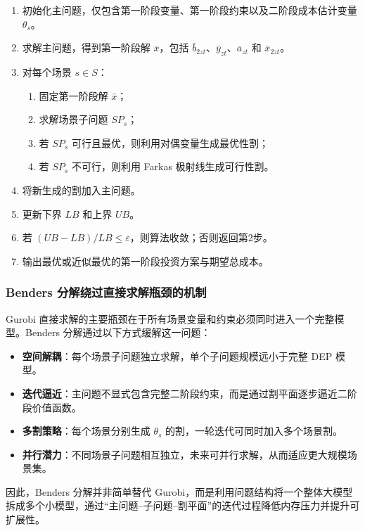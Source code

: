 \documentclass[12pt,a4paper]{article}
\newcommand{\手批注}[2]{\textcolor{#1}{\text{\kaishu #2}}}
\newcommand{\一阶段}{\textcolor{firststage}{\text{\kaishu （一阶段）}}}
\newcommand{\二阶段}{\textcolor{secondstage}{\text{\kaishu （二阶段）}}}
\begin{document}
\begin{enumerate}[itemsep=0.2em,leftmargin=2em]
    \item 初始化主问题，仅包含第一阶段变量、第一阶段约束以及二阶段成本估计变量 $\theta_s$。
    \item 求解主问题，得到第一阶段解 $\bar{x}$，包括 $\bar{b}_{2zt}$、$\bar{y}_{zt}$、$\bar{a}_{zt}$ 和 $\bar{x}_{2zt}$。
    \item 对每个场景 $s \in S$：
    \begin{enumerate}[itemsep=0.1em,leftmargin=2em]
        \item 固定第一阶段解 $\bar{x}$；
        \item 求解场景子问题 $SP_s$；
        \item 若 $SP_s$ 可行且最优，则利用对偶变量生成最优性割；
        \item 若 $SP_s$ 不可行，则利用 Farkas 极射线生成可行性割。
    \end{enumerate}
    \item 将新生成的割加入主问题。
    \item 更新下界 $LB$ 和上界 $UB$。
    \item 若 $(UB-LB)/LB \leq \varepsilon$，则算法收敛；否则返回第2步。
    \item 输出最优或近似最优的第一阶段投资方案与期望总成本。
\end{enumerate}

\subsubsection{Benders 分解绕过直接求解瓶颈的机制}

Gurobi 直接求解的主要瓶颈在于所有场景变量和约束必须同时进入一个完整模型。Benders 分解通过以下方式缓解这一问题：
\begin{itemize}[itemsep=0.2em,leftmargin=2em]
    \item \textbf{空间解耦}：每个场景子问题独立求解，单个子问题规模远小于完整 DEP 模型。
    \item \textbf{迭代逼近}：主问题不显式包含完整二阶段约束，而是通过割平面逐步逼近二阶段价值函数。
    \item \textbf{多割策略}：每个场景分别生成 $\theta_s$ 的割，一轮迭代可同时加入多个场景割。
    \item \textbf{并行潜力}：不同场景子问题相互独立，未来可并行求解，从而适应更大规模场景集。
\end{itemize}

因此，Benders 分解并非简单替代 Gurobi，而是利用问题结构将一个整体大模型拆成多个小模型，通过“主问题--子问题--割平面”的迭代过程降低内存压力并提升可扩展性。
\end{document}
